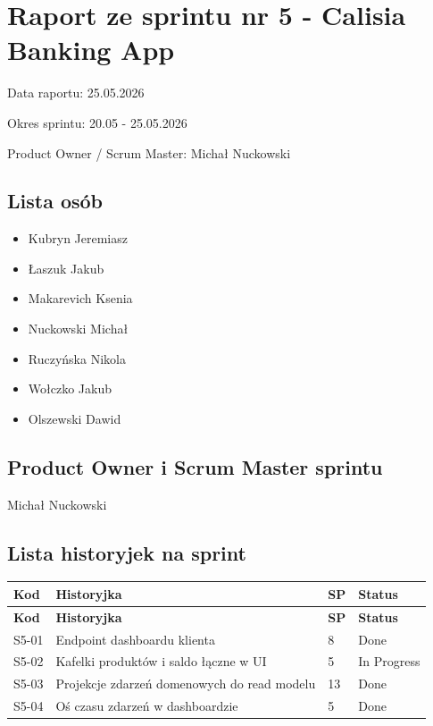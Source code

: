 \documentclass[12pt,a4paper]{article}
\begin{document}
\section*{Raport ze sprintu nr 5 - Calisia Banking App}
Data raportu: 25.05.2026

Okres sprintu: 20.05 - 25.05.2026

Product Owner / Scrum Master: Michał Nuckowski

\subsection*{Lista osób}
\begin{itemize}
\item Kubryn Jeremiasz
\item Łaszuk Jakub
\item Makarevich Ksenia
\item Nuckowski Michał
\item Ruczyńska Nikola
\item Wołczko Jakub
\item Olszewski Dawid
\end{itemize}

\subsection*{Product Owner i Scrum Master sprintu}
Michał Nuckowski

\subsection*{Lista historyjek na sprint}
\begingroup
\footnotesize
{}
\begin{longtable}{@{}C{0.08\textwidth}L{0.62\textwidth}C{0.10\textwidth}L{0.12\textwidth}@{}}
\toprule
{}
\textbf{Kod} & \textbf{Historyjka} & \textbf{SP} & \textbf{Status} \\
\midrule
\endfirsthead
\toprule
{}
\textbf{Kod} & \textbf{Historyjka} & \textbf{SP} & \textbf{Status} \\
\midrule
\endhead
S5-01 & Endpoint dashboardu klienta & 8 & Done \\
S5-02 & Kafelki produktów i saldo łączne w UI & 5 & In Progress \\
S5-03 & Projekcje zdarzeń domenowych do read modelu & 13 & Done \\
S5-04 & Oś czasu zdarzeń w dashboardzie & 5 & Done \\
\bottomrule
\end{longtable}
\endgroup
\end{document}
